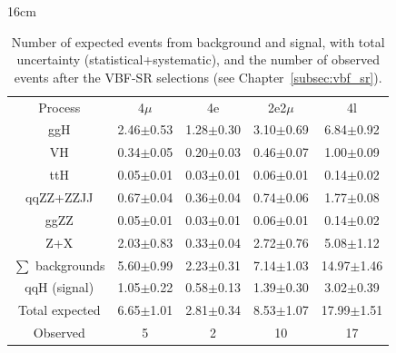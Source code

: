 \begin{table}[hbtp]{16cm}
	\caption{Number of expected events from background and signal, with total uncertainty (statistical+systematic), and the number of observed events after the VBF-SR selections (see Chapter~\ref{subsec:vbf_sr}).}
	\centering
	\begin{tabular}{c|c|c|c|c}
		\hline
		\rowcolor{light_gray}
		Process                     & 4$\mu$        & 4e            & 2e2$\mu$      & 4l\\
		ggH                         & 2.46$\pm$0.53 & 1.28$\pm$0.30 & 3.10$\pm$0.69 & 6.84$\pm$0.92\\
		VH                          & 0.34$\pm$0.05 & 0.20$\pm$0.03 & 0.46$\pm$0.07 & 1.00$\pm$0.09\\
		ttH                         & 0.05$\pm$0.01 & 0.03$\pm$0.01 & 0.06$\pm$0.01 & 0.14$\pm$0.02\\
		qqZZ+ZZJJ                   & 0.67$\pm$0.04 & 0.36$\pm$0.04 & 0.74$\pm$0.06 & 1.77$\pm$0.08\\
		ggZZ                        & 0.05$\pm$0.01 & 0.03$\pm$0.01 & 0.06$\pm$0.01 & 0.14$\pm$0.02\\
		Z+X                         & 2.03$\pm$0.83 & 0.33$\pm$0.04 & 2.72$\pm$0.76 & 5.08$\pm$1.12\\
		\hline
		$\sum$ backgrounds          & 5.60$\pm$0.99 & 2.23$\pm$0.31 & 7.14$\pm$1.03 & 14.97$\pm$1.46\\
		\hline
		qqH (signal) & 1.05$\pm$0.22 & 0.58$\pm$0.13 & 1.39$\pm$0.30 &  3.02$\pm$0.39\\
		\hline
		Total expected              & 6.65$\pm$1.01 & 2.81$\pm$0.34 & 8.53$\pm$1.07 & 17.99$\pm$1.51\\
		\hline
		Observed                    & 5             & 2             & 10            & 17\\
		\hline
	\end{tabular}
	\label{tab:vbf_sr_final_yields}
\end{table}

